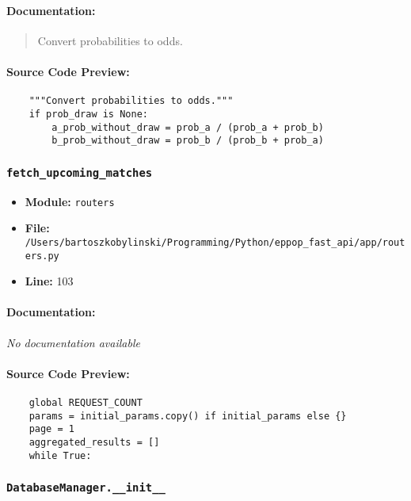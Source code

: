 \documentclass[11pt,a4paper]{article}
\begin{document}
\paragraph{Documentation:}
\begin{quote}
Convert probabilities to odds.
\end{quote}

\paragraph{Source Code Preview:}
\begin{verbatim}
    """Convert probabilities to odds."""
    if prob_draw is None:
        a_prob_without_draw = prob_a / (prob_a + prob_b)
        b_prob_without_draw = prob_b / (prob_b + prob_a)

\end{verbatim}

\vspace{1em}
\subsubsection{\texttt{fetch\_upcoming\_matches}}

\begin{itemize}
    \item \textbf{Module:} \texttt{routers}
    \item \textbf{File:} \texttt{/Users/bartoszkobylinski/Programming/Python/eppop\_fast\_api/app/routers.py}
    \item \textbf{Line:} 103
\end{itemize}

\paragraph{Documentation:} \textit{No documentation available}

\paragraph{Source Code Preview:}
\begin{verbatim}
    global REQUEST_COUNT
    params = initial_params.copy() if initial_params else {}
    page = 1
    aggregated_results = []
    while True:
\end{verbatim}

\vspace{1em}
\subsubsection{\texttt{DatabaseManager.\_\_init\_\_}}
\end{document}
